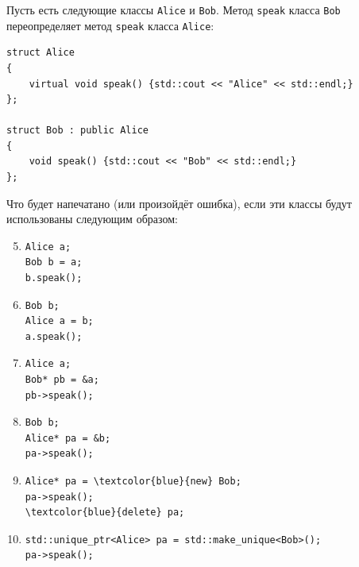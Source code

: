 \documentclass{article}
\begin{document}
\noindent Пусть есть следующие классы \texttt{Alice} и \texttt{Bob}. Метод \texttt{speak} класса \texttt{Bob} переопределяет метод \texttt{speak} класса \texttt{Alice}:
\begin{lstlisting}
struct Alice 
{
    virtual void speak() {std::cout << "Alice" << std::endl;}
};

struct Bob : public Alice 
{
    void speak() {std::cout << "Bob" << std::endl;}
};
\end{lstlisting}

\noindent Что будет напечатано (или произойдёт ошибка), если эти классы будут использованы следующим образом:

\begin{multicols}{2}
\begin{enumerate}
\setcounter{enumi}{4}
\item \begin{Verbatim}[commandchars=\\\{\}]
Alice a;
Bob b = a;
b.speak();
\end{Verbatim}

\item \begin{Verbatim}[commandchars=\\\{\}]
Bob b;
Alice a = b;
a.speak();
\end{Verbatim}
\end{enumerate}
\end{multicols}

\begin{multicols}{2}
\begin{enumerate}
\setcounter{enumi}{6}
\item \begin{Verbatim}[commandchars=\\\{\}]
Alice a;
Bob* pb = &a;
pb->speak();
\end{Verbatim}

\item \begin{Verbatim}[commandchars=\\\{\}]
Bob b;
Alice* pa = &b;
pa->speak();
\end{Verbatim}
\end{enumerate}
\end{multicols}


\begin{enumerate}
\setcounter{enumi}{8}
\item \begin{Verbatim}[commandchars=\\\{\}]
Alice* pa = \textcolor{blue}{new} Bob;
pa->speak();
\textcolor{blue}{delete} pa;
\end{Verbatim}

\item \begin{Verbatim}[commandchars=\\\{\}]
std::unique_ptr<Alice> pa = std::make_unique<Bob>();
pa->speak();
\end{Verbatim}
\end{enumerate}
\end{document}
